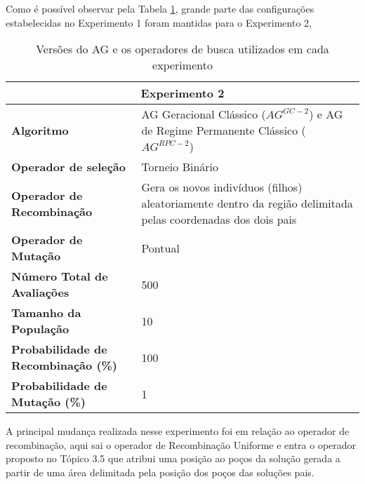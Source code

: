 Como é possível observar pela Tabela \ref{table:con02}, grande parte das configurações estabelecidas no Experimento 1 foram mantidas para o Experimento 2,

\begin{table}[H]
\centering
\caption{Versões do AG e os operadores de busca utilizados em cada experimento}
\label{table:con02}
\begin{tabular}{|p{6cm}|p{9cm}|}
\hline
\multicolumn{2}{|c|}{\textbf{Experimento 2}} \\ \hline
{\textbf{Algoritmo}} & AG Geracional Clássico ($AG^{GC-2}$) e AG de Regime Permanente Clássico ($AG^{RPC-2}$) \\ \hline
\textbf{Operador de seleção} & Torneio Binário \\ \hline
\textbf{Operador de Recombinação} & Gera os novos indivíduos (filhos) aleatoriamente dentro da região delimitada pelas coordenadas dos dois pais \\  \hline
\textbf{Operador de Mutação} & Pontual \\ \hline
\textbf{Número Total de Avaliações} & 500 \\ \hline
\textbf{Tamanho da População} & 10 \\ \hline
\textbf{Probabilidade de Recombinação (\%)} & 100 \\ \hline
\textbf{Probabilidade de Mutação (\%)} & 1 \\ \hline
\end{tabular}
\end{table}

A principal mudança realizada nesse experimento foi em relação ao operador de recombinação, aqui sai o operador de  Recombinação Uniforme e entra o operador proposto no Tópico 3.5 que atribui uma posição ao poços da solução gerada a partir de uma área delimitada pela posição dos poços das soluções pais.

